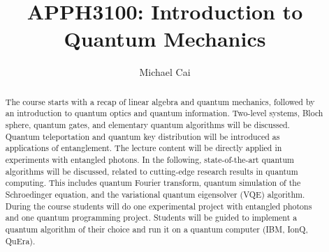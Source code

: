 \documentclass[a4paper]{report}
\author{Michael Cai}
\title{APPH3100: Introduction to Quantum Mechanics
}
\begin{document}
\maketitle

\begin{abstract}
	The course starts with a recap of linear algebra and quantum mechanics, followed by an introduction to quantum optics and quantum information. Two-level systems, Bloch sphere, quantum gates, and elementary quantum algorithms will be discussed. Quantum teleportation and quantum key distribution will be introduced as applications of entanglement. The lecture content will be directly applied in experiments with entangled photons. In the following, state-of-the-art quantum algorithms will be discussed, related to cutting-edge research results in quantum computing. This includes quantum Fourier transform, quantum simulation of the Schroedinger equation, and the variational quantum eigensolver (VQE) algorithm. During the course students will do one experimental project with entangled photons and one quantum programming project. Students will be guided to implement a quantum algorithm of their choice and run it on a quantum computer (IBM, IonQ, QuEra).

\end{abstract}

\newpage

\tableofcontents

\end{document}

